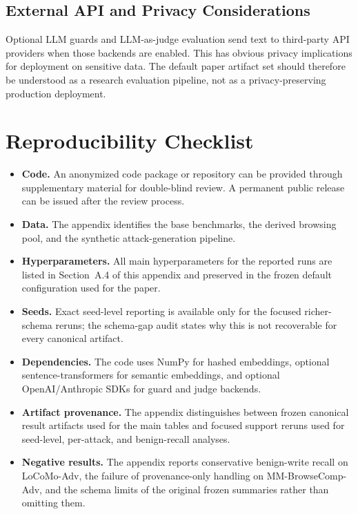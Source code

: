 \documentclass{article}
\begin{document}
\subsection{External API and Privacy Considerations}

Optional LLM guards and LLM-as-judge evaluation send text to third-party API providers when those backends are enabled. This has obvious privacy implications for deployment on sensitive data. The default paper artifact set should therefore be understood as a research evaluation pipeline, not as a privacy-preserving production deployment.

\section{Reproducibility Checklist}

\begin{itemize}
\setlength{\itemsep}{1pt}
\setlength{\parskip}{0pt}
\setlength{\parsep}{0pt}
\setlength{\topsep}{2pt}
\item \textbf{Code.} An anonymized code package or repository can be provided through supplementary material for double-blind review. A permanent public release can be issued after the review process.
\item \textbf{Data.} The appendix identifies the base benchmarks, the derived browsing pool, and the synthetic attack-generation pipeline.
\item \textbf{Hyperparameters.} All main hyperparameters for the reported runs are listed in Section~A.4 of this appendix and preserved in the frozen default configuration used for the paper.
\item \textbf{Seeds.} Exact seed-level reporting is available only for the focused richer-schema reruns; the schema-gap audit states why this is not recoverable for every canonical artifact.
\item \textbf{Dependencies.} The code uses NumPy for hashed embeddings, optional sentence-transformers for semantic embeddings, and optional OpenAI/Anthropic SDKs for guard and judge backends.
\item \textbf{Artifact provenance.} The appendix distinguishes between frozen canonical result artifacts used for the main tables and focused support reruns used for seed-level, per-attack, and benign-recall analyses.
\item \textbf{Negative results.} The appendix reports conservative benign-write recall on LoCoMo-Adv, the failure of provenance-only handling on MM-BrowseComp-Adv, and the schema limits of the original frozen summaries rather than omitting them.
\end{itemize}
\end{document}
